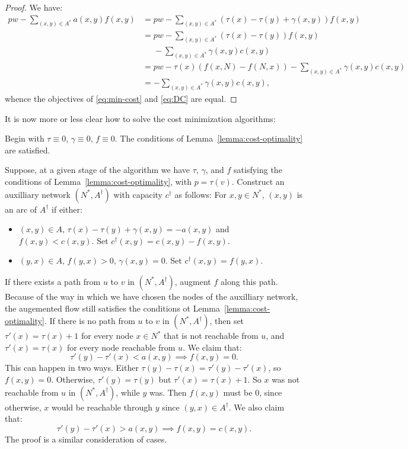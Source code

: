 \documentclass{amsbook}
\theoremstyle{definition}
\theoremstyle{remark}
\begin{document}
\begin{proof}
  We have:
  \begin{align*}
    pw-\sum_{(x,y)\in A^*} a(x,y)f(x,y) & = pw-\sum_{(x,y)\in A^*} (\tau(x)-\tau(y)+\gamma(x,y))f(x,y)\\
                                        & = pw - \sum_{(x,y)\in A^*} (\tau(x)-\tau(y))f(x,y)\\&\phantom{=} - \sum_{(x,y)\in A^*} \gamma(x,y)c(x,y)\\
                                        & = pw - \tau(x)(f(x,N) - f(N,x)) - \sum_{(x,y)\in A^*}\gamma(x,y)c(x,y)\\
    & = -\sum_{(x,y)\in A^*}\gamma(x,y)c(x,y),
  \end{align*}
  whence the objectives of \eqref{eq:min-cost} and \eqref{eq:DC} are equal.
\end{proof}
It is now more or less clear how to solve the cost minimization algorithms:

Begin with $\tau\equiv 0$, $\gamma\equiv 0$, $f\equiv 0$.
The conditions of Lemma~\ref{lemma:cost-optimality} are satisfied.

Suppose, at a given stage of the algorithm we have $\tau$, $\gamma$, and $f$ satisfying the conditions of Lemma~\ref{lemma:cost-optimality}, with $p=\tau(v)$.
Construct an auxilliary network $(N^*,A^\dagger)$ with capacity $c^\dagger$ as follows:
For $x,y\in N^*$, $(x,y)$ is an arc of $A^\dagger$ if either:
\begin{itemize}
\item $(x,y)\in A$, $\tau(x)-\tau(y)+\gamma(x,y)=-a(x,y)$ and $f(x,y)<c(x,y)$.
  Set $c^\dagger(x,y)=c(x,y)-f(x,y)$.
\item $(y,x)\in A$, $f(y,x)>0$, $\gamma(x,y)=0$.
  Set $c^\dagger(x,y)=f(y,x)$.
\end{itemize}
If there exists a path from $u$ to $v$ in $(N^*,A^\dagger)$, augment $f$ along this path.
Because of the way in which we have chosen the nodes of the auxilliary network, the augemented flow still satisfies the conditions ot Lemma~\ref{lemma:cost-optimality}.
If there is no path from $u$ to $v$ in $(N^*,A^\dagger)$, then set $\tau'(x)=\tau(x)+1$ for every node $x\in N^*$ that is not reachable from $u$, and $\tau'(x) = \tau(x)$ for every node reachable from $u$.
We claim that:
\begin{displaymath}
  \tau'(y)-\tau'(x)<a(x,y)\implies f(x,y)=0.
\end{displaymath}
This can happen in two ways.
Either $\tau(y)-\tau(x)=\tau'(y)-\tau'(x)$, so $f(x,y)=0$.
Otherwise, $\tau'(y)=\tau(y)$ but $\tau'(x)=\tau(x)+1$.
So $x$ was not reachable from $u$ in $(N^*,A^\dagger)$, while $y$ was.
Then $f(x,y)$ must be $0$, since otherwise, $x$ would be reachable through $y$ since $(y,x)\in A^\dagger$.
We also claim that:
\begin{displaymath}
  \tau'(y)-\tau'(x)>a(x,y) \implies f(x,y)=c(x,y).
\end{displaymath}
The proof is a similar consideration of cases.
\end{document}
